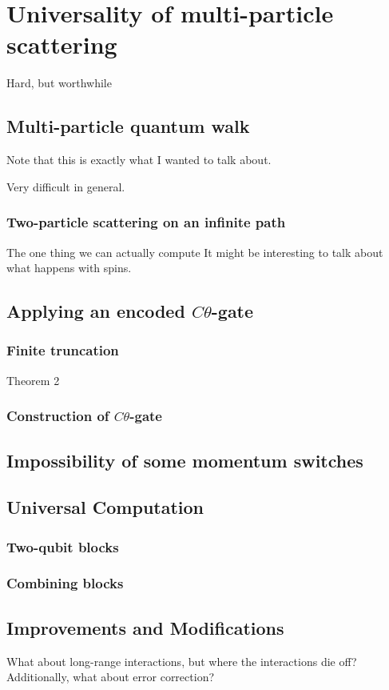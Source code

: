 \documentclass[../thesis-main/thesis-main]{subfiles}
\begin{document}
\chapter{Universality of multi-particle scattering}


Hard, but worthwhile



\section{Multi-particle quantum walk}

Note that this is exactly what I wanted to talk about.

Very difficult in general.

\subsection{Two-particle scattering on an infinite path}

The one thing we can actually compute
It might be interesting to talk about what happens with spins.




\section{Applying an encoded $C\theta$-gate}

\subsection{Finite truncation}

Theorem 2

\subsection{Construction of $C\theta$-gate}

\section{Impossibility of some momentum switches}

\section{Universal Computation}
\subsection{Two-qubit blocks}
\subsection{Combining blocks}


\section{Improvements and Modifications}

What about long-range interactions, but where the interactions die off?
Additionally, what about error correction?
\end{document}
